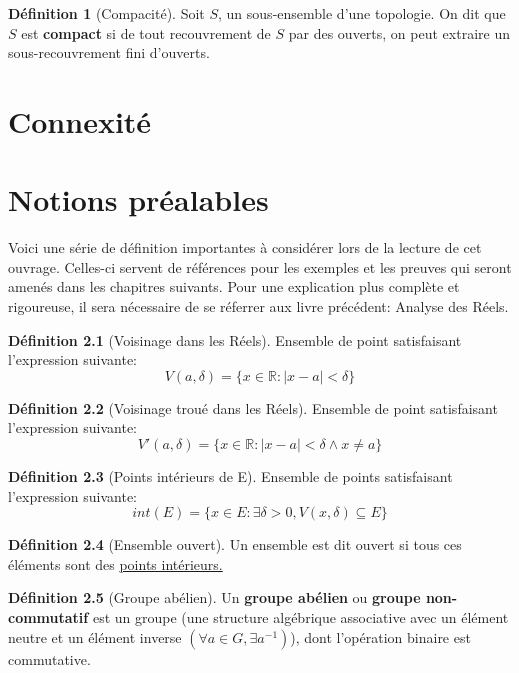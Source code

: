 \documentclass[12pt]{book}
\let\Bbb\mathbb
\theoremstyle{definition}
\newtheorem{definition}{Définition}[section]
\begin{document}
\begin{definition}[Compacité]
    \label{def:compacite}
    Soit $S$, un sous-ensemble d'une topologie. On dit que $S$ est \textbf{compact} si de tout recouvrement de $S$ par des ouverts, 
    on peut extraire un sous-recouvrement fini d'ouverts.
\end{definition}

\chapter{Connexité}

\appendix
\chapter{Notions préalables}
Voici une série de définition importantes à considérer lors de la lecture de cet ouvrage. Celles-ci servent
de références pour les exemples et les preuves qui seront amenés dans les chapitres suivants. Pour une explication
plus complète et rigoureuse, il sera nécessaire de se réferrer aux livre précédent: Analyse des Réels.

\begin{definition}[Voisinage dans les Réels]
    \label{def:voisinage_reels}
    Ensemble de point satisfaisant l'expression
    suivante: $$V(a, \delta) = \{ x \in \Bbb R : |x - a| < \delta \}$$
\end{definition}

\begin{definition}[Voisinage troué dans les Réels]
    \label{def:voisinage_troue_reels}
    Ensemble de point satisfaisant l'expression
    suivante: $$V'(a, \delta) = \{ x \in \Bbb R : |x - a| < \delta \land x \neq a \}$$
\end{definition}

\begin{definition}[Points intérieurs de E]
    \label{def:point_int}
    Ensemble de points satisfaisant l'expression
    suivante: $$int(E) = \{ x \in E : \exists \delta > 0, V(x, \delta) \subseteq E \} $$
\end{definition}

\begin{definition}[Ensemble ouvert]
    \label{def:ensemble_ouvert}
    Un ensemble est dit ouvert si tous ces éléments sont des \hyperref[def:point_int]{points intérieurs.}
\end{definition}

\begin{definition}[Groupe abélien]
    \label{def:groupe_abelien}
    Un \textbf{groupe abélien} ou \textbf{groupe non-commutatif} est un groupe
    (une structure algébrique associative avec un élément neutre et un élément inverse $(\forall a \in G, \exists a^{-1})$), 
    dont l'opération binaire est commutative.
\end{definition}
\end{document}
